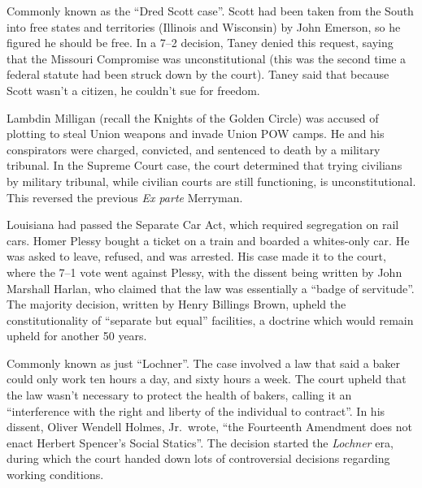 
Commonly known as the ``Dred Scott case''.
Scott had been taken from the South into free states and territories (Illinois and Wisconsin) by John Emerson,
so he figured he should be free.
In a 7--2 decision, Taney denied this request, saying that the Missouri Compromise was unconstitutional
(this was the second time a federal statute had been struck down by the court).
Taney said that because Scott wasn't a citizen, he couldn't sue for freedom.


Lambdin Milligan (recall the Knights of the Golden Circle) was accused of plotting to steal Union weapons
and invade Union POW camps.
He and his conspirators were charged, convicted, and sentenced to death by a military tribunal.
In the Supreme Court case, the court determined that trying civilians by military tribunal,
while civilian courts are still functioning, is unconstitutional.
This reversed the previous \textit{Ex parte} Merryman.


Louisiana had passed the Separate Car Act, which required segregation on rail cars.
Homer Plessy bought a ticket on a train and boarded a whites-only car.
He was asked to leave, refused, and was arrested.
His case made it to the court, where the 7--1 vote went against Plessy,
with the dissent being written by John Marshall Harlan,
who claimed that the law was essentially a ``badge of servitude''.
The majority decision, written by Henry Billings Brown,
upheld the constitutionality of ``separate but equal'' facilities,
a doctrine which would remain upheld for another 50 years.


Commonly known as just ``Lochner''.
The case involved a law that said a baker could only work ten hours a day, and sixty hours a week.
The court upheld that the law wasn't necessary to protect the health of bakers,
calling it an ``interference with the right and liberty of the individual to contract''.
In his dissent, Oliver Wendell Holmes, Jr.\ wrote,
``the Fourteenth Amendment does not enact Herbert Spencer's Social Statics''.
The decision started the \textit{Lochner} era,
during which the court handed down lots of controversial decisions regarding working conditions.

